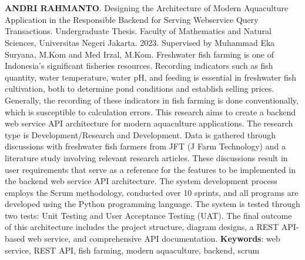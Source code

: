\chapter*{}

\begin{spacing}{1}
\textbf{ANDRI RAHMANTO}. Designing the Architecture of Modern Aquaculture Application in the Responsible Backend for Serving Webservice Query Transactions. Undergraduate Thesis. Faculty of Mathematics and Natural Sciences, Universitas Negeri Jakarta. 2023. Supervised by Muhammad Eka Suryana, M.Kom and Med Irzal, M.Kom.
\newline
\newline
Freshwater fish farming is one of Indonesia's significant fisheries resources. Recording indicators such as fish quantity, water temperature, water pH, and feeding is essential in freshwater fish cultivation, both to determine pond conditions and establish selling prices. Generally, the recording of these indicators in fish farming is done conventionally, which is susceptible to calculation errors. This research aims to create a backend web service API architecture for modern aquaculture applications. The research type is Development/Research and Development. Data is gathered through discussions with freshwater fish farmers from JFT (J Farm Technology) and a literature study involving relevant research articles. These discussions result in user requirements that serve as a reference for the features to be implemented in the backend web service API architecture. The system development process employs the Scrum methodology, conducted over 10 sprints, and all programs are developed using the Python programming language. The system is tested through two tests: Unit Testing and User Acceptance Testing (UAT). The final outcome of this architecture includes the project structure, diagram designs, a REST API-based web service, and comprehensive API documentation.
\newline
\newline
\noindent \textbf{Keywords}: web service, REST API, fish farming, modern aquaculture, backend, scrum
\end{spacing}
